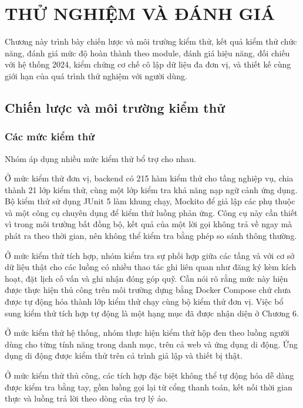 \documentclass[12pt,a4paper,oneside]{report}
\begin{document}
\chapter{THỬ NGHIỆM VÀ ĐÁNH GIÁ}

Chương này trình bày chiến lược và môi trường kiểm thử, kết quả kiểm thử chức năng, đánh giá mức độ hoàn thành theo module, đánh giá hiệu năng, đối chiếu với hệ thống 2024, kiểm chứng cơ chế cô lập dữ liệu đa đơn vị, và thiết kế cùng giới hạn của quá trình thử nghiệm với người dùng.

\section{Chiến lược và môi trường kiểm thử}

\subsection{Các mức kiểm thử}

Nhóm áp dụng nhiều mức kiểm thử bổ trợ cho nhau.

Ở mức kiểm thử đơn vị, backend có 215 hàm kiểm thử cho tầng nghiệp vụ, chia thành 21 lớp kiểm thử, cùng một lớp kiểm tra khả năng nạp ngữ cảnh ứng dụng. Bộ kiểm thử sử dụng JUnit 5 làm khung chạy, Mockito để giả lập các phụ thuộc và một công cụ chuyên dụng để kiểm thử luồng phản ứng. Công cụ này cần thiết vì trong môi trường bất đồng bộ, kết quả của một lời gọi không trả về ngay mà phát ra theo thời gian, nên không thể kiểm tra bằng phép so sánh thông thường.

Ở mức kiểm thử tích hợp, nhóm kiểm tra sự phối hợp giữa các tầng và với cơ sở dữ liệu thật cho các luồng có nhiều thao tác ghi liên quan như đăng ký kèm kích hoạt, đặt lịch cố vấn và ghi nhận đóng góp quỹ. Cần nói rõ rằng mức này hiện được thực hiện thủ công trên môi trường dựng bằng Docker Compose chứ chưa được tự động hóa thành lớp kiểm thử chạy cùng bộ kiểm thử đơn vị. Việc bổ sung kiểm thử tích hợp tự động là một hạng mục đã được nhận diện ở Chương 6.

Ở mức kiểm thử hệ thống, nhóm thực hiện kiểm thử hộp đen theo luồng người dùng cho từng tính năng trong danh mục, trên cả web và ứng dụng di động. Ứng dụng di động được kiểm thử trên cả trình giả lập và thiết bị thật.

Ở mức kiểm thử thủ công, các tích hợp đặc biệt không thể tự động hóa dễ dàng được kiểm tra bằng tay, gồm luồng gọi lại từ cổng thanh toán, kết nối thời gian thực và luồng trả lời theo dòng của trợ lý ảo.
\end{document}
